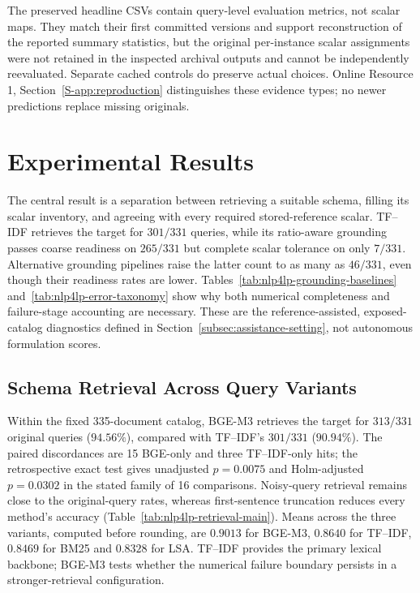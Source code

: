 \documentclass[pdflatex,iicol,sn-basic,Numbered]{sn-jnl}
\begin{document}
The preserved headline CSVs contain query-level evaluation metrics, not scalar maps. They match their first committed versions and support reconstruction of the reported summary statistics, but the original per-instance scalar assignments were not retained in the inspected archival outputs and cannot be independently reevaluated. Separate cached controls do preserve actual choices. Online Resource 1, Section~\ref{S-app:reproduction} distinguishes these evidence types; no newer predictions replace missing originals.



\section{Experimental Results}
\label{sec:experiments}
The central result is a separation between retrieving a suitable schema, filling its scalar inventory, and agreeing with every required stored-reference scalar. TF--IDF retrieves the target for $301/331$ queries, while its ratio-aware grounding passes coarse readiness on $265/331$ but complete scalar tolerance on only $7/331$. Alternative grounding pipelines raise the latter count to as many as $46/331$, even though their readiness rates are lower. Tables~\ref{tab:nlp4lp-grounding-baselines} and~\ref{tab:nlp4lp-error-taxonomy} show why both numerical completeness and failure-stage accounting are necessary. These are the reference-assisted, exposed-catalog diagnostics defined in Section~\ref{subsec:assistance-setting}, not autonomous formulation scores.

\subsection{Schema Retrieval Across Query Variants}
\label{subsec:exp_retrieval}
Within the fixed 335-document catalog, BGE-M3 retrieves the target for $313/331$ original queries ($94.56\%$), compared with TF--IDF's $301/331$ ($90.94\%$). The paired discordances are 15 BGE-only and three TF--IDF-only hits; the retrospective exact test gives unadjusted $p=0.0075$ and Holm-adjusted $p=0.0302$ in the stated family of 16 comparisons. Noisy-query retrieval remains close to the original-query rates, whereas first-sentence truncation reduces every method's accuracy (Table~\ref{tab:nlp4lp-retrieval-main}). Means across the three variants, computed before rounding, are $0.9013$ for BGE-M3, $0.8640$ for TF--IDF, $0.8469$ for BM25 and $0.8328$ for LSA. TF--IDF provides the primary lexical backbone; BGE-M3 tests whether the numerical failure boundary persists in a stronger-retrieval configuration.
\end{document}
